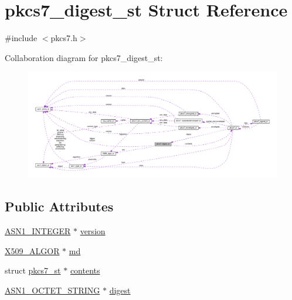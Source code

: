 \hypertarget{structpkcs7__digest__st}{}\section{pkcs7\+\_\+digest\+\_\+st Struct Reference}
\label{structpkcs7__digest__st}


{\ttfamily \#include $<$pkcs7.\+h$>$}



Collaboration diagram for pkcs7\+\_\+digest\+\_\+st\+:
\nopagebreak
\begin{figure}[H]
\begin{center}
\leavevmode
\includegraphics[width=350pt]{structpkcs7__digest__st__coll__graph}
\end{center}
\end{figure}
\subsection*{Public Attributes}
\begin{DoxyCompactItemize}
\item 
\hyperlink{ossl__typ_8h_af4335399bf9774cb410a5e93de65998b}{A\+S\+N1\+\_\+\+I\+N\+T\+E\+G\+ER} $\ast$ \hyperlink{structpkcs7__digest__st_ad46797a922e60a6fc3a30e0e694dd7d4}{version}
\item 
\hyperlink{ossl__typ_8h_aa2b6185e6254f36f709cd6577fb5022e}{X509\+\_\+\+A\+L\+G\+OR} $\ast$ \hyperlink{structpkcs7__digest__st_a76481d96de4d0f8457fe75c6d29131e6}{md}
\item 
struct \hyperlink{structpkcs7__st}{pkcs7\+\_\+st} $\ast$ \hyperlink{structpkcs7__digest__st_ac519ce261ee599eaacd0ac4f2f06ebe7}{contents}
\item 
\hyperlink{ossl__typ_8h_afbd05e94e0f0430a2b729473efec88c1}{A\+S\+N1\+\_\+\+O\+C\+T\+E\+T\+\_\+\+S\+T\+R\+I\+NG} $\ast$ \hyperlink{structpkcs7__digest__st_ad75a037194fd4d99c1a5aa180a8e96e8}{digest}
\end{DoxyCompactItemize}


